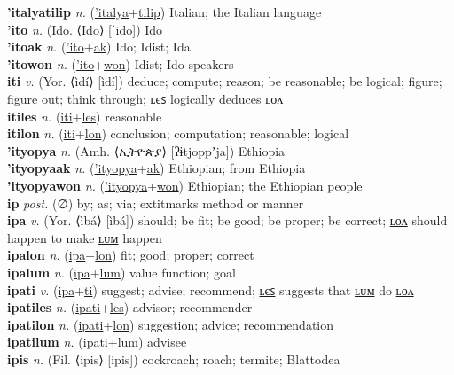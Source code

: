 \textbf{'italyatilip} \textit{n.} (\hyperref['italya]{'italya}+\hyperref[tilip]{tilip})
Italian; the Italian language \label{'italyatilip} \\
\textbf{'ito} \textit{n.} (Ido. ⟨Ido⟩ [ˈido])
Ido \label{'ito} \\
\textbf{'itoak} \textit{n.} (\hyperref['ito]{'ito}+\hyperref[ak]{ak})
Ido; Idist; Ida \label{'itoak} \\
\textbf{'itowon} \textit{n.} (\hyperref['ito]{'ito}+\hyperref[won]{won})
Idist; Ido speakers \label{'itowon} \\
\textbf{iti} \textit{v.} (Yor. ⟨ìdí⟩ [ìdí])
deduce; compute; reason; be reasonable; be logical; figure; figure out; think through; \hyperref[itiles]{ʟєꜱ} logically deduces \hyperref[itilon]{ʟᴏᴧ} \label{iti} \\
\textbf{itiles} \textit{n.} (\hyperref[iti]{iti}+\hyperref[les]{les})
reasonable \label{itiles} \\
\textbf{itilon} \textit{n.} (\hyperref[iti]{iti}+\hyperref[lon]{lon})
conclusion; computation; reasonable; logical \label{itilon} \\
\textbf{'ityopya} \textit{n.} (Amh. ⟨ኢትዮጵያ⟩ [ʔɨtjoppʼja])
Ethiopia \label{'ityopya} \\
\textbf{'ityopyaak} \textit{n.} (\hyperref['ityopya]{'ityopya}+\hyperref[ak]{ak})
Ethiopian; from Ethiopia \label{'ityopyaak} \\
\textbf{'ityopyawon} \textit{n.} (\hyperref['ityopya]{'ityopya}+\hyperref[won]{won})
Ethiopian; the Ethiopian people \label{'ityopyawon} \\
\textbf{ip} \textit{post.} (∅)
by; as; via; 	extit{marks method or manner} \label{ip} \\
\textbf{ipa} \textit{v.} (Yor. ⟨ìbá⟩ [ìbá])
should; be fit; be good; be proper; be correct; \hyperref[ipalon]{ʟᴏᴧ} should happen to make \hyperref[ipalum]{ʟᴜᴍ} happen \label{ipa} \\
\textbf{ipalon} \textit{n.} (\hyperref[ipa]{ipa}+\hyperref[lon]{lon})
fit; good; proper; correct \label{ipalon} \\
\textbf{ipalum} \textit{n.} (\hyperref[ipa]{ipa}+\hyperref[lum]{lum})
value function; goal \label{ipalum} \\
\textbf{ipati} \textit{v.} (\hyperref[ipa]{ipa}+\hyperref[ti]{ti})
suggest; advise; recommend; \hyperref[ipatiles]{ʟєꜱ} suggests that \hyperref[ipatilum]{ʟᴜᴍ} do \hyperref[ipatilon]{ʟᴏᴧ} \label{ipati} \\
\textbf{ipatiles} \textit{n.} (\hyperref[ipati]{ipati}+\hyperref[les]{les})
advisor; recommender \label{ipatiles} \\
\textbf{ipatilon} \textit{n.} (\hyperref[ipati]{ipati}+\hyperref[lon]{lon})
suggestion; advice; recommendation \label{ipatilon} \\
\textbf{ipatilum} \textit{n.} (\hyperref[ipati]{ipati}+\hyperref[lum]{lum})
advisee \label{ipatilum} \\
\textbf{ipis} \textit{n.} (Fil. ⟨ipis⟩ [ipis])
cockroach; roach; termite; Blattodea \label{ipis} \\
